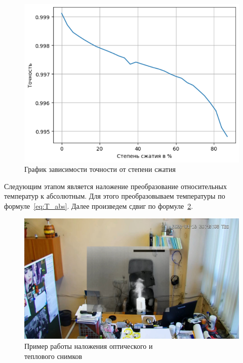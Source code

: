 \documentclass[14pt, a4paper]{extreport}
\begin{document}
	\begin{figure}[h!]
		\centering
		\includegraphics[width = 13cm]{image/chapter_3/accuracy_plot}
		\vspace*{-0.2cm}	
		\caption{График зависимости точности от степени сжатия}		
		\vspace*{0.4cm}
		\label{fig:accuracy_plot}
	\end{figure}
	
	Следующим этапом является наложение преобразование относительных температур к абсолютным. Для этого преобразовываем температуры по формуле~\ref{eq:T_abs}. Далее произведем сдвиг по формуле~\ref{fig:nalozhenie}.
	\begin{figure}[h!]
		\centering
		\includegraphics[width = 13cm]{image/chapter_2/nalozhenie}	
		\caption{Пример работы наложения оптического и\\теплового снимков}
		\label{fig:nalozhenie}
	\end{figure}
	
\end{document}
